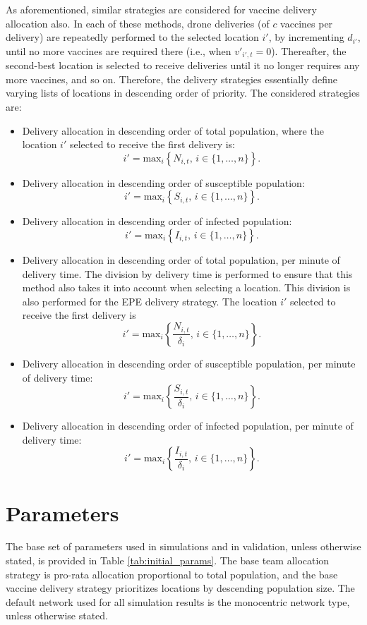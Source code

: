 \documentclass[10pt,letterpaper]{article}
\begin{document}
As aforementioned, similar strategies are considered for vaccine delivery allocation also. In each of these methods, drone deliveries (of $c$ vaccines per delivery) are repeatedly performed to the selected location $i'$, by incrementing $d_{i'}$, until no more vaccines are required there (i.e., when $v'_{i',t} = 0$). Thereafter, the second-best location is selected to receive deliveries until it no longer requires any more vaccines, and so on. Therefore, the delivery strategies essentially define varying lists of locations in descending order of priority. The considered strategies are:
\begin{itemize}
    \item Delivery allocation in descending order of total population, where the location $i'$ selected to receive the first delivery is:
    $$i' = \text{max}_{i}\left\{ N_{i,t}, \, i \in \{1, \dots, n \} \right\}.$$
    \item Delivery allocation in descending order of susceptible population:
    $$i' = \text{max}_{i}\left\{ S_{i,t}, \, i \in \{1, \dots, n \} \right\}.$$
    \item Delivery allocation in descending order of infected population: 
    $$i' = \text{max}_{i}\left\{ I_{i,t}, \, i \in \{1, \dots, n \} \right\}.$$
    \item Delivery allocation in descending order of total population, per minute of delivery time. The division by delivery time is performed to ensure that this method also takes it into account when selecting a location. This division is also performed for the EPE delivery strategy. The location $i'$ selected to receive the first delivery is 
    $$i' = \text{max}_{i}\left\{ \frac{N_{i,t}}{\delta_{i}}, \, i \in \{1, \dots, n \} \right\}.$$
    \item Delivery allocation in descending order of susceptible population, per minute of delivery time:
    $$i' = \text{max}_{i}\left\{ \frac{S_{i,t}}{\delta_{i}}, \, i \in \{1, \dots, n \} \right\}.$$
    \item Delivery allocation in descending order of infected population, per minute of delivery time:
    $$i' = \text{max}_{i}\left\{ \frac{I_{i,t}}{\delta_{i}}, \, i \in \{1, \dots, n \} \right\}.$$
\end{itemize}

\section*{Parameters}
The base set of parameters used in simulations and in validation, unless otherwise stated, is provided in Table \ref{tab:initial_params}. The base team allocation strategy is pro-rata allocation proportional to total population, and the base vaccine delivery strategy prioritizes locations by descending population size. The default network used for all simulation results is the monocentric network type, unless otherwise stated.
\end{document}
